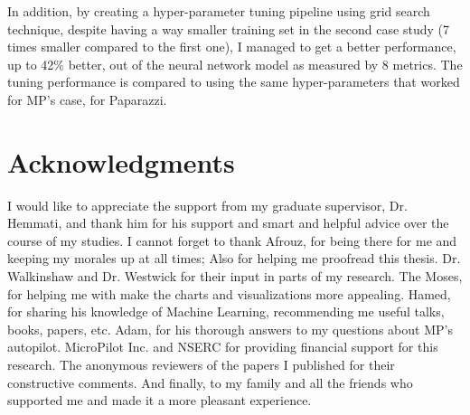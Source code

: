 In addition, by creating a hyper-parameter tuning pipeline using grid search technique, despite having a way smaller training set in the second case study (7 times smaller compared to the first one), I managed to get a better performance, up to 42\% better, out of the neural network model as measured by 8 metrics.
The tuning performance is compared to using the same hyper-parameters that worked for MP's case, for Paparazzi.%




\chapter{Acknowledgments}
I would like to appreciate the support from my graduate supervisor, Dr. Hemmati, and thank him for his support and smart and helpful advice over the course of my studies.
I cannot forget to thank Afrouz, for being there for me and keeping my morales up at all times; Also for helping me proofread this thesis.
Dr. Walkinshaw and Dr. Westwick for their input in parts of my research.
The Moses, for helping me with make the charts and visualizations more appealing.
Hamed, for sharing his knowledge of Machine Learning, recommending me useful talks, books, papers, etc.
Adam, for his thorough answers to my questions about MP's autopilot.
MicroPilot Inc. and NSERC for providing financial support for this research.
The anonymous reviewers of the papers I published for their constructive comments.
And finally, to my family and all the friends who supported me and made it a more pleasant experience.


